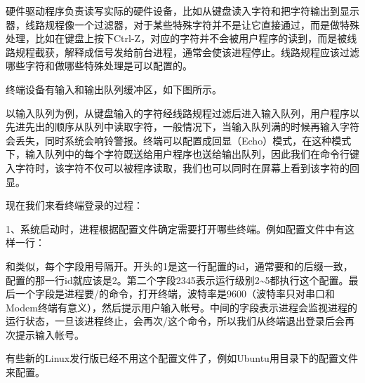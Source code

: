 硬件驱动程序负责读写实际的硬件设备，比如从键盘读入字符和把字符输出到显示器，线路规程像一个过滤器，对于某些特殊字符并不是让它直接通过，而是做特殊处理，比如在键盘上按下Ctrl-Z，对应的字符并不会被用户程序的读到，而是被线路规程截获，解释成信号发给前台进程，通常会使该进程停止。线路规程应该过滤哪些字符和做哪些特殊处理是可以配置的。



终端设备有输入和输出队列缓冲区，如下图所示。




以输入队列为例，从键盘输入的字符经线路规程过滤后进入输入队列，用户程序以先进先出的顺序从队列中读取字符，一般情况下，当输入队列满的时候再输入字符会丢失，同时系统会响铃警报。终端可以配置成回显（Echo）模式，在这种模式下，输入队列中的每个字符既送给用户程序也送给输出队列，因此我们在命令行键入字符时，该字符不仅可以被程序读取，我们也可以同时在屏幕上看到该字符的回显。



现在我们来看终端登录的过程：



1、系统启动时，进程根据配置文件确定需要打开哪些终端。例如配置文件中有这样一行：




和类似，每个字段用\BookCode{:\BookSplit{}}号隔开。开头的1是这一行配置的id，通常要和的后缀一致，配置的那一行id就应该是2。第二个字段2345表示运行级别2\textasciitilde{}\BookSplit{}5都执行这个配置。最后一个字段是进程要/的命令，打开终端，波特率是9600（波特率只对串口和Modem终端有意义），然后提示用户输入帐号。中间的字段表示进程会监视进程的运行状态，一旦该进程终止，会再次/这个命令，所以我们从终端退出登录后会再次提示输入帐号。



有些新的Linux发行版已经不用这个配置文件了，例如Ubuntu用目录下的配置文件来配置。



